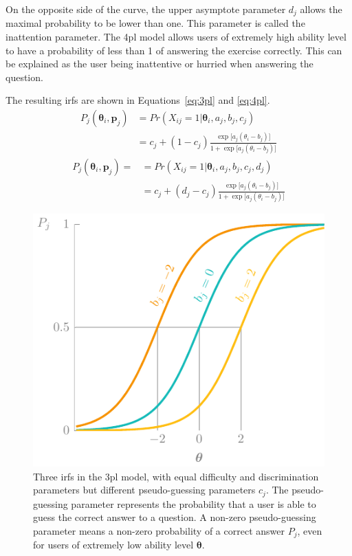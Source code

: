 On the opposite side of the curve, the upper asymptote parameter $d_j$ allows the maximal probability to be lower than one. 
This parameter is called the inattention parameter. 
The \gls{4pl} model allows users of extremely high ability level to have a probability of less than 1 of answering the exercise correctly.
This can be explained as the user being inattentive or hurried when answering the question.

The resulting \glspl{irf} are shown in Equations~\ref{eq:3pl} and \ref{eq:4pl}.
\begin{equation}
\begin{split}
    \label{eq:3pl}
    P_{j}(\bm{\theta}_i,\bm{p}_j)
    & = Pr(X_{ij} = 1 | \bm{\theta}_i,a_j,b_j,c_j) \\
    & = c_j + (1-c_j) \frac{\exp\big[a_j(\theta_i - b_j)\big]}{1 + \exp\big[a_j(\theta_i - b_j)\big]}
\end{split}
\end{equation}
\begin{equation}
\begin{split}
    \label{eq:4pl}
    P_{j}(\bm{\theta}_i,\bm{p}_j) =
    & = Pr(X_{ij} = 1 | \bm{\theta}_i,a_j,b_j,c_j,d_j)\\
    & = c_j + (d_j-c_j) \frac{\exp\big[a_j(\theta_i - b_j)\big]}{1 + \exp\big[a_j(\theta_i - b_j)\big]}
\end{split}
\end{equation}

\begin{figure}
    \centering
    \includegraphics[page=4]{03-education/figures/tikzfigures.pdf}
    \caption[Item response functions of the 3PL model]{Three \glspl{irf} in the \gls{3pl} model, with equal difficulty and discrimination parameters but different pseudo-guessing parameters $c_j$. The pseudo-guessing parameter represents the probability that a user is able to guess the correct answer to a question. A non-zero pseudo-guessing parameter means a non-zero probability of a correct answer $P_j$, even for users of extremely low ability level $\bm\theta$.}
    \label{fig:3pl}
\end{figure}

